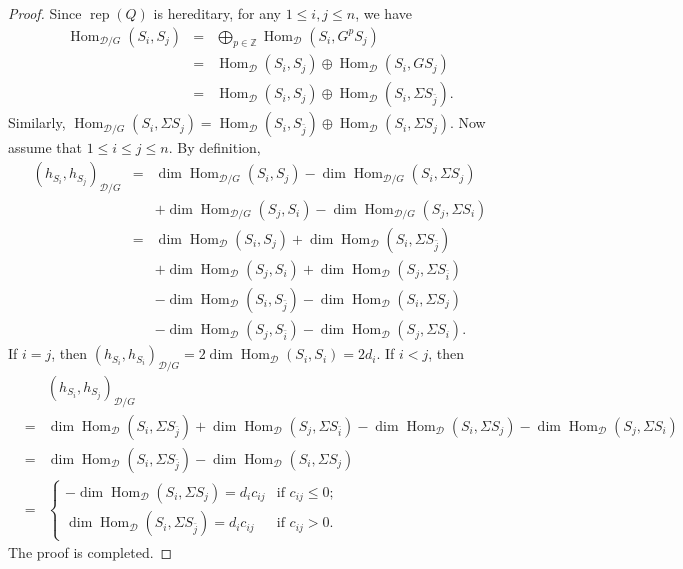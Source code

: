 \documentclass[12pt,reqno]{amsart}
\numberwithin{equation}{section}
\newcommand{\rep}{\operatorname{rep}\nolimits}
\newcommand{\Hom}{\operatorname{Hom}\nolimits}
\renewcommand{\dim}{\operatorname{dim}\nolimits}
\begin{document}
	\begin{proof}
		Since $\rep(Q)$ is hereditary, for any $1\leq i,j\leq n$, we have
		\begin{eqnarray*}
			\Hom_{\mathcal{D}/G}(S_i,S_j)&=&\bigoplus_{p\in \mathbb{Z}}\Hom_{\mathcal{D}}(S_i,G^pS_j)\\
			&=&\Hom_{\mathcal{D}}(S_i,S_j)\oplus \Hom_{\mathcal{D}}(S_i,GS_j)\\
			&=&\Hom_{\mathcal{D}}(S_i,S_j)\oplus \Hom_{\mathcal{D}}(S_i,\Sigma S_{\bar{j}}).
		\end{eqnarray*}
		Similarly,  $\Hom_{\mathcal{D}/G}(S_i,\Sigma S_j)=\Hom_{\mathcal{D}}(S_i,S_{\bar{j}})\oplus \Hom_{\mathcal{D}}(S_i,\Sigma S_j)$.
		Now assume that $1\leq i\leq j\leq n$.  By definition, 
		\begin{eqnarray*}
			(h_{S_i},h_{S_j})_{\mathcal{D}/G}
			&=&\dim \Hom_{\mathcal{D}/G}(S_i,S_j)-\dim \Hom_{\mathcal{D}/G}(S_i,\Sigma S_j)\\
			&&+\dim \Hom_{\mathcal{D}/G}(S_j,S_i)-\dim \Hom_{\mathcal{D}/G}(S_j,\Sigma S_i)\\
			&=& \dim \Hom_{\mathcal{D}}(S_i,S_j)+\dim \Hom_{\mathcal{D}}(S_i,\Sigma S_{\bar{j}})\\
			&&+\dim \Hom_{\mathcal{D}}(S_j,S_i)
			+\dim \Hom_{\mathcal{D}}(S_j,\Sigma S_{\bar{i}})\\
			&&-\dim \Hom_{\mathcal{D}}(S_i,S_{\bar{j}})-\dim \Hom_{\mathcal{D}}(S_i,\Sigma S_j)\\
			&&-\dim \Hom_{\mathcal{D}}(S_j,S_{\bar{i}})-\dim \Hom_{\mathcal{D}}(S_j,\Sigma S_i).
		\end{eqnarray*}
		If $i=j$, then $(h_{S_i},h_{S_i})_{\mathcal{D}/G}=2\dim \Hom_{\mathcal{D}}(S_i,S_i)=2d_i$.  
		If $i<j$, then 
		\begin{eqnarray*}
			&&(h_{S_i},h_{S_j})_{\mathcal{D}/G}\\
			&=&\dim \Hom_{\mathcal{D}}(S_i,\Sigma S_{\bar{j}})+\dim \Hom_{\mathcal{D}}(S_j,\Sigma S_{\bar{i}})-\dim \Hom_{\mathcal{D}}(S_i,\Sigma S_{{j}})-\dim \Hom_{\mathcal{D}}(S_j,\Sigma S_{{i}})\\
			&=&\dim \Hom_{\mathcal{D}}(S_i,\Sigma S_{\bar{j}})-\dim \Hom_{\mathcal{D}}(S_i,\Sigma S_{{j}})\\
			&=&\begin{cases}
				-\dim\Hom_{\mathcal{D}}(S_i,\Sigma S_j)=d_ic_{ij} &\text{if $c_{ij}\leq 0$};\\
				\dim \Hom_{\mathcal{D}}(S_i,\Sigma S_{\bar{j}})=d_ic_{ij}&\text{if $c_{ij}> 0$}.
			\end{cases}
		\end{eqnarray*}
		The proof is completed.
	\end{proof}
\end{document}
